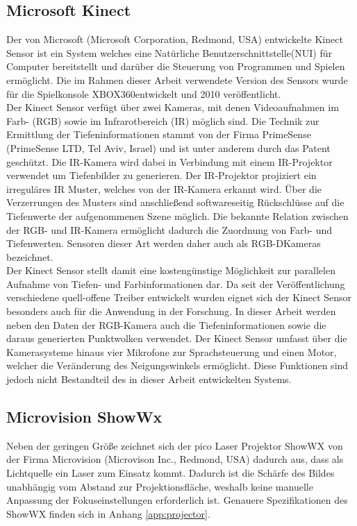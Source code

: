 \subsection{Microsoft Kinect}
Der von Microsoft (Microsoft Corporation, Redmond, USA) entwickelte Kinect Sensor ist ein System welches eine Natürliche Benutzerschnittstelle\red[Definition] (NUI) für Computer  bereitstellt und darüber die Steuerung von Programmen und Spielen ermöglicht. Die im Rahmen dieser Arbeit verwendete Version des Sensors wurde für die Spielkonsole XBOX360\red[TM] entwickelt und 2010 veröffentlicht.\\
Der Kinect Sensor verfügt über zwei Kameras, mit denen Videoaufnahmen im Farb- (RGB) sowie im Infrarotbereich (IR) möglich sind. Die Technik zur Ermittlung der Tiefeninformationen stammt von der Firma PrimeSense (PrimeSense LTD, Tel Aviv, Israel) und ist unter anderem durch das Patent \cite{Freedman2008} geschützt. Die IR-Kamera wird dabei in Verbindung mit einem IR-Projektor verwendet um Tiefenbilder zu generieren. Der IR-Projektor projiziert ein irreguläres IR Muster, welches von der IR-Kamera erkannt wird. Über die Verzerrungen des Musters sind anschließend softwareseitig Rückschlüsse auf die Tiefenwerte der aufgenommenen Szene möglich. Die bekannte Relation zwischen der RGB- und IR-Kamera ermöglicht dadurch die Zuordnung von Farb- und Tiefenwerten. Sensoren dieser Art werden daher auch als RGB-D\red[footnote] Kameras bezeichnet.\\
Der Kinect Sensor stellt damit eine kostengünstige Möglichkeit zur parallelen Aufnahme von Tiefen- und Farbinformationen dar. Da seit der Veröffentlichung verschiedene quell-offene Treiber entwickelt wurden eignet sich der Kinect Sensor besonders auch für die Anwendung in der Forschung. In dieser Arbeit werden neben den Daten der RGB-Kamera auch die Tiefeninformationen sowie die daraus generierten Punktwolken verwendet. Der Kinect Sensor umfasst über die Kamerasysteme hinaus vier Mikrofone zur Sprachsteuerung und einen Motor, welcher die Veränderung des Neigungswinkels ermöglicht. Diese Funktionen sind jedoch nicht Bestandteil des in dieser Arbeit entwickelten Systems.\\


\subsection{Microvision ShowWx}%
Neben der geringen Größe zeichnet sich der pico Laser Projektor ShowWX von der Firma Microvision (Microvison Inc., Redmond, USA) dadurch aus, dass als Lichtquelle ein Laser zum Einsatz kommt. Dadurch ist die Schärfe des Bildes unabhängig vom Abstand zur Projektionsfläche, weshalb keine manuelle Anpassung der Fokuseinstellungen erforderlich ist.  Genauere Spezifikationen des ShowWX finden sich in Anhang \ref{app:projector}.

